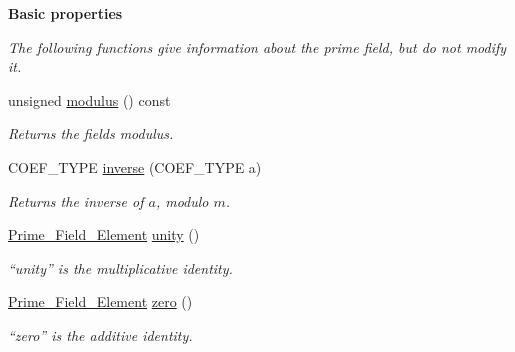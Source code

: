\begin{Indent}\textbf{ Basic properties}\par
{\em The following functions give information about the prime field, but do not modify it. }\begin{DoxyCompactItemize}
\item 
\mbox{\label{class_prime___field_a342ee34fa19d33919f772669a637f31e}} 
unsigned \hyperlink{class_prime___field_a342ee34fa19d33919f772669a637f31e}{modulus} () const
\begin{DoxyCompactList}\small\item\em Returns the field\textquotesingle{}s modulus. \end{DoxyCompactList}\item 
C\+O\+E\+F\+\_\+\+T\+Y\+PE \hyperlink{class_prime___field_ab14cab08e6c2862e8470193112b69868}{inverse} (C\+O\+E\+F\+\_\+\+T\+Y\+PE a)
\begin{DoxyCompactList}\small\item\em Returns the inverse of $a$, modulo $m$. \end{DoxyCompactList}\item 
\mbox{\label{class_prime___field_ad9e3622a14de40faa75056ed40d67bb2}} 
\hyperlink{class_prime___field___element}{Prime\+\_\+\+Field\+\_\+\+Element} \hyperlink{class_prime___field_ad9e3622a14de40faa75056ed40d67bb2}{unity} ()
\begin{DoxyCompactList}\small\item\em ``unity'' is the multiplicative identity. \end{DoxyCompactList}\item 
\mbox{\label{class_prime___field_a9dc12c3a50f6368a1c2f7cc1bddcb9eb}} 
\hyperlink{class_prime___field___element}{Prime\+\_\+\+Field\+\_\+\+Element} \hyperlink{class_prime___field_a9dc12c3a50f6368a1c2f7cc1bddcb9eb}{zero} ()
\begin{DoxyCompactList}\small\item\em ``zero'' is the additive identity. \end{DoxyCompactList}\end{DoxyCompactItemize}
\end{Indent}
